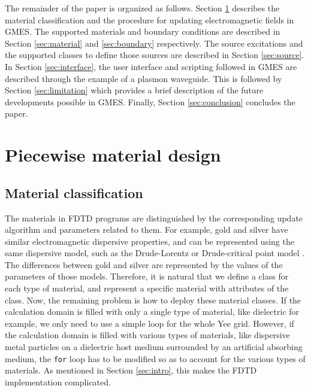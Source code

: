 The remainder of the paper is organized as follows. Section \ref{sec:pwmaterial} describes the material classification and the procedure for updating electromagnetic fields in GMES. The supported materials and boundary conditions are described in Section \ref{sec:material} and \ref{sec:boundary} respectively. The source excitations and the supported classes to define those sources are described in Section \ref{sec:source}. In Section \ref{sec:interface}, the user interface and scripting followed in GMES are described through the example of a plasmon waveguide. This is followed by Section \ref{sec:limitation} which provides a brief description of the future developments possible in GMES. Finally, Section \ref{sec:conclusion} concludes the paper.

\section{Piecewise material design}
\label{sec:pwmaterial}
\subsection{Material classification}
The materials in FDTD programs are distinguished by the corresponding update algorithm and parameters related to them. For example, gold and silver have similar electromagnetic dispersive properties, and can be represented using the same dispersive model, such as the Drude-Lorentz \cite{rakic_optical_1998} or Drude-critical point model \cite{etchegoin_analytic_2006,etchegoin_erratum:_2007,vial_comparison_2008}. The differences between gold and silver are represented by the values of the parameters of those models. Therefore, it is natural that we define a class for each type of material, and represent a specific material with attributes of the class. Now, the remaining problem is how to deploy these material classes. If the calculation domain is filled with only a single type of material, like dielectric for example, we only need to use a simple loop for the whole Yee grid. However, if the calculation domain is filled with various types of materials, like dispersive metal particles on a dielectric host medium surrounded by an artificial absorbing medium, the \texttt{for} loop has to be modified so as to account for the various types of materials. As mentioned in Section \ref{sec:intro}, this makes the FDTD implementation complicated.

